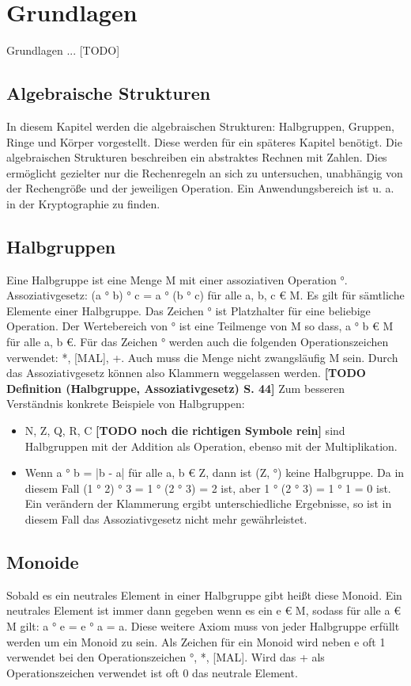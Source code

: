 \section{Grundlagen}
	Grundlagen ... [TODO]
	
	\subsection{Algebraische Strukturen}
		In diesem Kapitel werden die algebraischen Strukturen: Halbgruppen, Gruppen, Ringe und Körper vorgestellt. Diese werden für ein späteres Kapitel benötigt. Die algebraischen Strukturen beschreiben ein abstraktes Rechnen mit Zahlen. Dies ermöglicht gezielter nur die Rechenregeln an sich zu untersuchen, unabhängig von der Rechengröße und der jeweiligen Operation. Ein Anwendungsbereich ist u. a. in der Kryptographie zu finden. 
	
		\subsection{Halbgruppen}
			Eine Halbgruppe ist eine Menge M mit einer assoziativen Operation °. Assoziativgesetz: (a ° b) ° c = a ° (b ° c) für alle a, b, c € M. Es gilt für sämtliche Elemente einer Halbgruppe. Das Zeichen ° ist Platzhalter für eine beliebige Operation. Der Wertebereich von ° ist eine Teilmenge von M so dass, a ° b € M für alle a, b €. Für das Zeichen ° werden auch die folgenden Operationszeichen verwendet: *, [MAL], +. Auch muss die Menge nicht zwangsläufig M sein. Durch das Assoziativgesetz können also Klammern weggelassen werden. \textbf{[TODO Definition (Halbgruppe, Assoziativgesetz) S. 44]} Zum besseren Verständnis konkrete Beispiele von Halbgruppen:
			
			\begin{itemize}
				\item N, Z, Q, R, C \textbf{[TODO noch die richtigen Symbole rein]} sind Halbgruppen mit der Addition als Operation, ebenso mit der Multiplikation.
				\item Wenn a ° b = |b - a| für alle a, b € Z, dann ist (Z, °) keine Halbgruppe. Da in diesem Fall (1 ° 2) ° 3 = 1 ° (2 ° 3) = 2 ist, aber 1 ° (2 ° 3) = 1 ° 1 = 0 ist. Ein verändern der Klammerung ergibt unterschiedliche Ergebnisse, so ist in diesem Fall das Assoziativgesetz nicht mehr gewährleistet.
			\end{itemize}
		
		\subsection{Monoide}
			Sobald es ein neutrales Element in einer Halbgruppe gibt heißt diese Monoid. Ein neutrales Element ist immer dann gegeben wenn es ein e € M, sodass für alle a € M gilt: a ° e = e ° a = a. Diese weitere Axiom muss von jeder Halbgruppe erfüllt werden um ein Monoid zu sein. Als Zeichen für ein Monoid wird neben e oft 1 verwendet bei den Operationszeichen °, *, [MAL]. Wird das + als Operationszeichen verwendet ist oft 0 das neutrale Element.
		
